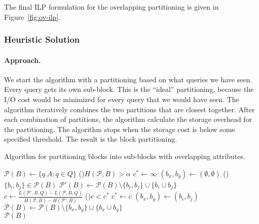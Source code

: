 The final ILP formulation for the overlapping partitioning is given in
Figure~\ref{fig:ov-ilp}.

\subsubsection{Heuristic Solution}

\paragraph*{Approach.$\,$} We start the algorithm with a   partitioning based
on what queries we have seen. Every query gets its own sub-block. This is the
``ideal'' partitioning, because the I/O cost would be minimized for every
query that we would have seen. The algorithm iteratively combines the two
partitions that are closest together.  After each combination of partitions,
the algorithm calculate the storage overhead for the partitioning. The
algorithm stops when the  storage cost is below some specified threshold.  The
result is the block partitioning.

\begin{algorithm}[ht]
\scriptsize
\caption{Algorithm for partitioning blocks into sub-blocks with overlapping attributes.}
\label{alg:overlappingP}
$\mathcal{P}(B) \leftarrow \{q.A: q\in Q\}$ 
\While(){$H(\mathcal{P},B) > \alpha$}{
  $c^{*}\gets \infty $ 
  $(b_x,b_y)\gets (\emptyset,\emptyset)$ 
  \For(){$\{b_i,b_j\}\in\mathcal{P}(B)$}{
    $\mathcal{P'}(B) \leftarrow \mathcal{P}(B) \setminus \{b_i, b_j\} \cup \{b_i \cup b_j\}$\\
    $c\gets \frac{L(\mathcal{P}',B,Q)-L(\mathcal{P},B,Q)}{H(\mathcal{P},B)-H(\mathcal{P}',B)}$
    \If(){$c<c^{*}$}{
        $c^{*}\gets c$
        $(b_x,b_y)\gets (b_i,b_j)$
    }
  }
  $\mathcal{P}(B) \leftarrow \mathcal{P}(B) \setminus \{b_x, b_y\} \cup \{b_x \cup b_y\}$ \\
}
\Return $ \mathcal{P}(B)$  
\end{algorithm} 

